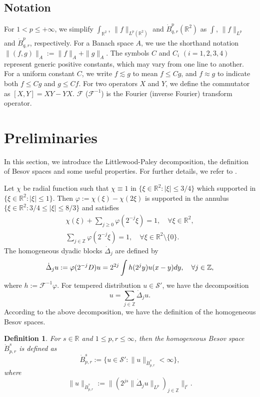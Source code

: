 \documentclass[10pt,a4paper]{amsart}
\numberwithin{equation}{section}
\newtheorem{definition}[theorem]{Definition}
\begin{document}
\subsection*{Notation} For $1< p\leqslant+\infty$, we simplify $\int_{\mathbb{R}^2}$,
$\|f\|_{L^p(\mathbb{R}^2)}$ and $\dot{B}^p_{q,r}(\mathbb{R}^2)$ as
$\int$, $\|f\|_{L^p}$ and $\dot{B}^p_{q,r}$, respectively. For a Banach space $A$, we use the
shorthand notation $\|(f,g)\|_A:=\|f\|_A+\|g\|_A$.
 The symbols $C$ and $C_i$ $(i=1,2,3,4)$ represent generic positive constants, which may vary
 from one line to another. For a uniform constant $C$, we write $f\lesssim g$ to mean $f\leqslant Cg$,
 and $f\approx g$ to indicate both $f\leqslant Cg$ and $g\leqslant Cf$. For two operators $X$ and $Y$, we define the commutator as $[X,Y]=XY-YX$. $\mathcal{F}$ ($\mathcal{F}^{-1}$) is the Fourier (inverse Fourier) transform operator.

\section{Preliminaries}\label{subsec:02}

In this section, we introduce the Littlewood-Paley decomposition, the definition of
Besov spaces and some useful properties. For further details, we refer to
\cite{MR2768550}.

Let $\chi$ be radial function such that $\chi\equiv1$ in
$\{\xi\in\mathbb{R}^2:|\xi|\leqslant 3/4\}$ which supported in
$\{\xi\in\mathbb{R}^2:|\xi|\leqslant 1\}$. Then $\varphi:=\chi(\xi)-\chi(2\xi)$
is supported in the annulus $\{\xi\in\mathbb{R}^2:3/4\leqslant|\xi|\leqslant 8/3\}$
and satisfies
\begin{gather*}
 \chi(\xi)+\sum_{j\geqslant 0}\varphi(2^{-j}\xi)=1,\quad \forall\xi\in\mathbb{R}^2,\\
 \sum_{j\in\mathbb{Z}}\varphi(2^{-j}\xi)=1,\quad \forall\xi\in\mathbb{R}^2\setminus \{0\}.
\end{gather*}
The homogeneous dyadic blocks $\dot{\Delta}_j$ are defined by
\[
 \dot{\Delta}_ju:=\varphi(2^{-j}D)u=2^{2j}\int h(2^jy)u(x-y){\rm d}y,\quad
 \forall j\in\mathbb{Z},
\]
where $h:=\mathcal{F}^{-1}\varphi$. For tempered distribution $u\in \mathcal{S}'$,
 we have the decomposition
\[
 u=\sum_{j\in\mathbb{Z}}\dot{\Delta}_ju.
\]
According to the above decomposition, we have the definition of the homogeneous Besov
spaces.
\begin{definition}\label{def2.1} \rm
 For $s\in\mathbb{R}$ and $1\leqslant p,r\leqslant\infty$, then the homogeneous
Besov space $\dot{B}^s_{p,r}$ is defined as
\[
 \dot{B}^s_{p,r}:=\{u\in\mathcal{S}':\|u\|_{\dot{B}^s_{p,r}}<\infty\},
\]
 where
\[
 \|u\|_{\dot{B}^s_{p,r}}:=\|(2^{js}\|\dot{\Delta}_ju\|_{L^p})_{j\in\mathbb{Z}}\|_{l^r}.
\]
\end{definition}
\end{document}
